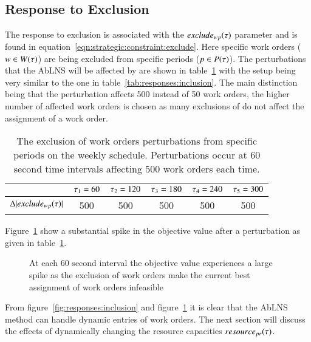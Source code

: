 \subsection{Response to Exclusion}\label{sec:exclusion}
The response to exclusion is associated with the $exclude_{wp}(\tau)$
parameter and is found in equation~\ref{eqn:strategic:constraint:exclude}.
Here specific work orders ($w \in W(\tau)$) are
being excluded from specific periods ($p \in P(\tau)$).
The perturbations that the AbLNS will be affected by are shown in
table~\ref{tab:responses:exclusion}
with the setup being very similar to the
one in table~\ref{tab:responses:inclusion}.
The main distinction being that the perturbation affects 500 instead of 50 work orders, the higher number 
of affected work orders is chosen as many exclusions of do not affect the assignment of a work order.

\begin{table}[H]
	\centering
	\begin{tabular}{cccccc}
	\toprule
	                                & $\tau_1 = 60$ & $\tau_2 = 120$ & $\tau_3 = 180$ & $\tau_4 = 240$ & $\tau_5 = 300$ \\ \midrule
	$\Delta |exclude_{wp}(\tau)|$ & 500                   & 500                    & 500                    & 500                    & 500                    \\ \bottomrule
	\end{tabular}
	\caption{The exclusion of work orders perturbations from specific periods on the weekly schedule. 
		Perturbations occur at 60 second time intervals affecting 500 work orders each time.
	}\label{tab:responses:exclusion}
\end{table}

Figure~\ref{fig:responses:exclusion}  show a substantial spike in the objective value  
after a perturbation as given in table~\ref{tab:responses:exclusion}. 

\begin{figure}[H]
	\centering
	\resizebox{10cm}{!}{
		
	}
	\caption{At each 60 second interval the objective value experiences a 
	large spike as the exclusion of work orders make the current best
	assignment of work orders infeasible}\label{fig:responses:exclusion}
\end{figure}

From figure~\ref{fig:responses:inclusion} and figure~\ref{fig:responses:exclusion} it is 
clear that the AbLNS method can handle dynamic entries of work orders. The next section will discuss the effects of dynamically changing the 
resource capacities $\ParStrategicResource$. 

